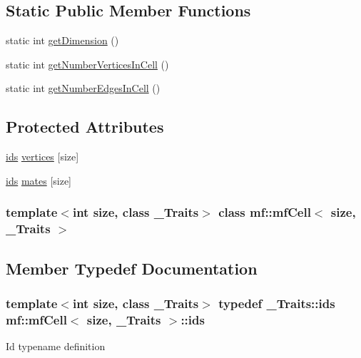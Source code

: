 \subsection*{Static Public Member Functions}
\begin{DoxyCompactItemize}
\item 
static int \hyperlink{classmf_1_1mfCell_adca6e1707e9d8487c22b3cd0117791a0}{getDimension} ()
\item 
static int \hyperlink{classmf_1_1mfCell_ae5031384bc660f1a804ab6603b8c1a19}{getNumberVerticesInCell} ()
\item 
static int \hyperlink{classmf_1_1mfCell_a16cc93bf1fa21c95014d000c9750e4a0}{getNumberEdgesInCell} ()
\end{DoxyCompactItemize}
\subsection*{Protected Attributes}
\begin{DoxyCompactItemize}
\item 
\hyperlink{classmf_1_1mfBase_a3b23f16ddf59da0a91ab12cf57c1f111}{ids} \hyperlink{classmf_1_1mfCell_a4d540b27089268665e1800cb7bf6b04d}{vertices} \mbox{[}size\mbox{]}
\item 
\hyperlink{classmf_1_1mfBase_a3b23f16ddf59da0a91ab12cf57c1f111}{ids} \hyperlink{classmf_1_1mfCell_a4bc12b8877d6ade93549032c569bb40f}{mates} \mbox{[}size\mbox{]}
\end{DoxyCompactItemize}
\subsubsection*{template$<$int size, class \_\-Traits$>$ class mf::mfCell$<$ size, \_\-Traits $>$}



\subsection{Member Typedef Documentation}
\hypertarget{classmf_1_1mfCell_a9e32102899fb1e6b5e95b08a6c71063f}{
\subsubsection[{ids}]{\setlength{\rightskip}{0pt plus 5cm}template$<$int size, class \_\-Traits$>$ typedef \_\-Traits::ids {\bf mf::mfCell}$<$ size, \_\-Traits $>$::{\bf ids}}}
\label{classmf_1_1mfCell_a9e32102899fb1e6b5e95b08a6c71063f}
Id typename definition 

